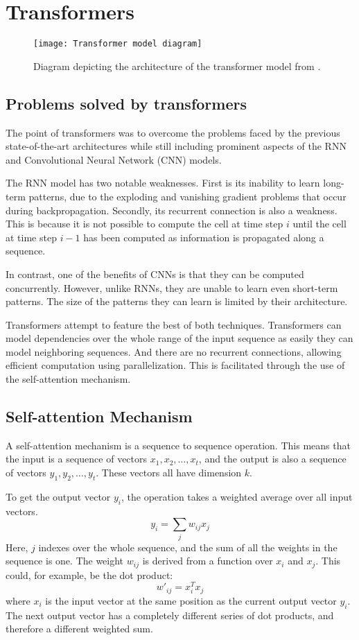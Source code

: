\section{Transformers}
\begin{figure}[h]
\centering
\texttt{[image: Transformer model diagram]}
\caption{Diagram depicting the architecture of the transformer model from \citet{AttentionIsAllYouNeed}.}
\end{figure}
\subsection{Problems solved by transformers}
The point of transformers was to overcome the problems faced by the previous state-of-the-art architectures while still including prominent aspects of the RNN and Convolutional Neural Network (CNN) models.

The RNN model has two notable weaknesses. First is its inability to learn long-term patterns, due to the exploding and vanishing gradient problems that occur during backpropagation.
Secondly, its recurrent connection is also a weakness. This is because it is not possible to compute the cell at time step $i$ until the cell at time step $i-1$ has been computed as information is propagated along a sequence.

In contrast, one of the benefits of CNNs is that they can be computed concurrently. However, unlike RNNs, they are unable to learn even short-term patterns. The size of the patterns they can learn is limited by their architecture.

Transformers attempt to feature the best of both techniques.
Transformers can model dependencies over the whole range of the input sequence as easily they can model neighboring sequences. And there are no recurrent connections, allowing efficient computation using parallelization. This is facilitated through the use of the self-attention mechanism.\cite{TransformersScratchPeterbloem}


\subsection{Self-attention Mechanism}
A self-attention mechanism is a sequence to sequence operation. This means that the input is a sequence of vectors $x_{1},x_{2},\ldots, x_{t}$, and the output is also a sequence of vectors $y_{1},y_{2},\ldots, y_{t}$.
These vectors all have dimension $k$.

To get the output vector $y_{i}$, the operation takes a weighted average over all input vectors.
$$
y_{i}=\sum_{j}w_{ij}x_{j}
$$
Here, $j$ indexes over the whole sequence, and the sum of all the weights in the sequence is one.
The weight $w_{ij}$ is derived from a function over $x_{i}$ and $x_{j}$.
This could, for example, be the dot product:
$$
w'_{ij}=x_{i}^Tx_{j}
$$
where $x_{i}$ is the input vector at the same position as the current output vector $y_{i}$.
The next output vector has a completely different series of dot products, and therefore a different weighted sum.

